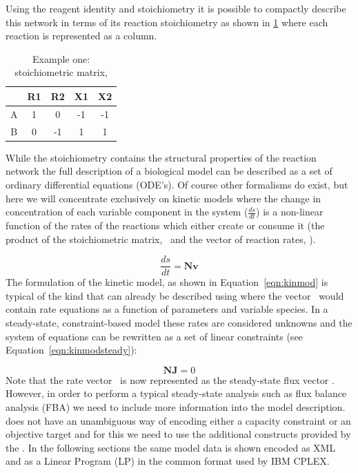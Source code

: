 %
%
Using the reagent identity and stoichiometry it is possible to compactly
describe this network in terms of its reaction stoichiometry as shown in
\ref{tble:ex1nmat} where each reaction is represented as a column.

\begin{table}[h]
  \centering
    \begin{tabular}{c|cccc}
          & R1 & R2 & X1 & X2 \\ \hline
        A & 1 &  0 & -1 & -1 \\
        B & 0 & -1 &  1 &  1 \\
    \end{tabular}
  \caption{Example one: stoichiometric matrix, \Nmat}
  \label{tble:ex1nmat}
\end{table}
%
While the stoichiometry contains the structural properties of the
reaction network the full description of a biological model can be
described as a set of ordinary differential equations (ODE's). Of course
other formalisms do exist, but here we will concentrate exclusively on
kinetic models where the change in concentration of each variable
component in the system ($\frac{ds}{dt}$) is a non-linear function of
the rates of the reactions which either create or consume it (the
product of the stoichiometric matrix, \Nmat\ and the vector of reaction
rates, \vvec).


%
\begin{equation}\label{eqn:kinmod}
  \frac{ds}{dt} = \textbf{Nv}
\end{equation}
%
The formulation of the kinetic model, as shown in
Equation~\ref{eqn:kinmod} is typical of the kind that can already be
described using \sbmlthreecore where the vector \vvec\ would contain
rate equations as a function of parameters and variable species. In a
steady-state, constraint-based model these rates are considered unknowns
and the system of equations can be rewritten as a set of linear
constraints (see Equation~\ref{eqn:kinmodsteady}):


%
\begin{equation}\label{eqn:kinmodsteady}
  \textbf{NJ} = 0
\end{equation}
%
Note that the rate vector \vvec\ is now represented as the steady-state
flux vector \Jvec. However, in order to perform a typical steady-state
analysis such as flux balance analysis (FBA) we need to include more
information into the model description. \sbmlthreecore does not have an
unambiguous way of encoding either a capacity constraint or an objective
target and for this we need to use the additional constructs provided by
the \FBCPackage. In the following sections the same model data is shown
encoded as XML and as a Linear Program (LP) in the common format used by
IBM \textsf{CPLEX}.


